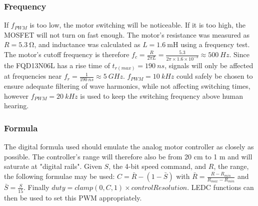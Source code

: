 \subsubsection{Frequency}

If $f_{PWM}$ is too low, the motor switching will be noticeable. If it is too high, the MOSFET will not turn on fast enough.
The motor's resistance was measured as $R = \SI{5.3}{\ohm}$, and inductance was calculated as $L = \SI{1.6}{\milli\henry}$ using a frequency test.
The motor's cutoff frequency is therefore $f_c = \frac{R}{2 \pi L} = \frac{5.3}{2 \pi \times 1.6 \times 10^{-3}} \approx \SI{500}{Hz}$.
Since the FQD13N06L has a rise time of $t_{r(max)} = \SI{190}{ns}$, signals will only be affected at frequencies near $f_r = \frac{1}{\SI{190}{ns}} \approx \SI{5}{GHz}$.
$f_{PWM} = \SI{10}{kHz}$ could safely be chosen to ensure adequate filtering of wave harmonics, while not affecting switching times,
however $f_{PWM} = \SI{20}{kHz}$ is used to keep the switching frequency above human hearing.

\subsubsection{Formula}

The digital formula used should emulate the analog motor controller as closely as possible. The controller's range will therefore also be from 20 cm to 1 m
and will saturate at "digital rails". Given $S$, the 4-bit speed command, and $R$, the range, the following formulae may be used:
$C = \bar{R} - (1 - \bar{S})$ with $\bar{R} = \frac{R - R_{min}}{R_{max} - R_{min}}$ and $\bar{S} = \frac{S}{15}$.
Finally $duty = clamp(0, C, 1) \times controlResolution$. LEDC functions can then be used \cite{ledControl} to set this PWM appropriately.